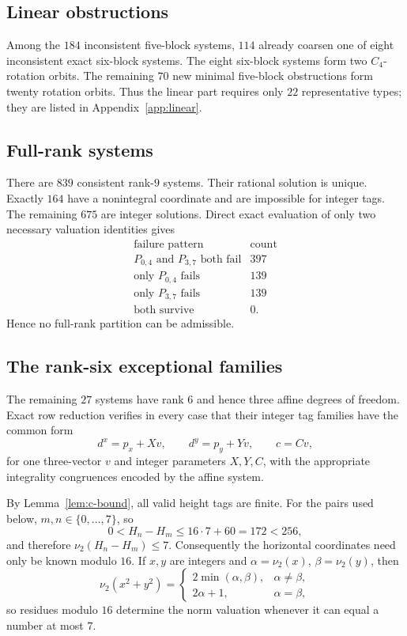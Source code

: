 \documentclass[11pt]{article}
\newcommand{\vTwo}{\nu_2}
\newcommand{\PPair}[2]{P_{#1,#2}}
\begin{document}
\subsection{Linear obstructions}
Among the $184$ inconsistent five-block systems, $114$ already coarsen one of
eight inconsistent exact six-block systems. The eight six-block systems form
two $C_4$-rotation orbits. The remaining $70$ new minimal five-block
obstructions form twenty rotation orbits. Thus the linear part requires only
$22$ representative types; they are listed in Appendix~\ref{app:linear}.

\subsection{Full-rank systems}
There are $839$ consistent rank-$9$ systems. Their rational solution is unique.
Exactly $164$ have a nonintegral coordinate and are impossible for integer tags.
The remaining $675$ are integer solutions. Direct exact evaluation of only two
necessary valuation identities gives
\[
\begin{array}{c|r}
\text{failure pattern}&\text{count}\\\hline
\PPair{0}{4}\text{ and }\PPair{3}{7}\text{ both fail}&397\\
\text{only }\PPair{0}{4}\text{ fails}&139\\
\text{only }\PPair{3}{7}\text{ fails}&139\\
\text{both survive}&0.
\end{array}
\]
Hence no full-rank partition can be admissible.

\subsection{The rank-six exceptional families}
The remaining $27$ systems have rank $6$ and hence three affine degrees of
freedom. Exact row reduction verifies in every case that their integer tag
families have the common form
\begin{equation}\label{eq:rank6-form}
 d^x=p_x+Xv,\qquad d^y=p_y+Yv,\qquad c=Cv,
\end{equation}
for one three-vector $v$ and integer parameters $X,Y,C$, with the appropriate
integrality congruences encoded by the affine system.

By Lemma~\ref{lem:c-bound}, all valid height tags are finite. For the pairs used
below, $m,n\in\{0,\dots,7\}$, so
\[
0<H_n-H_m\le16\cdot7+60=172<256,
\]
and therefore $\vTwo(H_n-H_m)\le7$. Consequently the horizontal coordinates
need only be known modulo $16$. If $x,y$ are integers and
$\alpha=\vTwo(x)$, $\beta=\vTwo(y)$, then
\[
\vTwo(x^2+y^2)=
\begin{cases}
2\min(\alpha,\beta),&\alpha\ne\beta,\\
2\alpha+1,&\alpha=\beta,
\end{cases}
\]
so residues modulo $16$ determine the norm valuation whenever it can equal a
number at most $7$.
\end{document}
